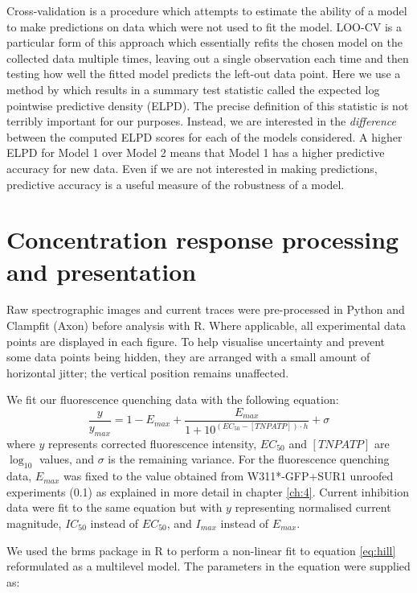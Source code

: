 Cross-validation is a procedure which attempts to estimate the ability of a model to make predictions on data which were not used to fit the model.
LOO-CV is a particular form of this approach which essentially refits the chosen model on the collected data multiple times, leaving out a single observation each time and then testing how well the fitted model predicts the left-out data point.
Here we use a method by \textcite{vehtari_practical_2017} which results in a summary test statistic called the expected log pointwise predictive density (ELPD).
The precise definition of this statistic is not terribly important for our purposes.
Instead, we are interested in the \textit{difference} between the computed ELPD scores for each of the models considered.
A higher ELPD for Model 1 over Model 2 means that Model 1 has a higher predictive accuracy for new data.
Even if we are not interested in making predictions, predictive accuracy is a useful measure of the robustness of a model.

\section{Concentration response processing and presentation}
Raw spectrographic images and current traces were pre-processed in Python and Clampfit (Axon) before analysis with R.
Where applicable, all experimental data points are displayed in each figure.
To help visualise uncertainty and prevent some data points being hidden, they are arranged with a small amount of horizontal jitter; the vertical position remains unaffected.

We fit our fluorescence quenching data with the following equation:
\begin{equation} \label{eq:hill}
    \frac{y}{y_{max}} = 1 - E_{max} + \frac{E_{max}}{1 + 10^{(EC_{50} - [TNPATP]) \cdot h}} + \sigma
\end{equation}
where $y$ represents corrected fluorescence intensity, $EC_{50}$ and $[TNPATP]$ are $\log_{10}$ values, and $\sigma$ is the remaining variance.
For the fluorescence quenching data, $E_{max}$ was fixed to the value obtained from W311*-GFP+SUR1 unroofed experiments (0.1) as explained in more detail in chapter \ref{ch:4}.
Current inhibition data were fit to the same equation but with $y$ representing normalised current magnitude, $IC_{50}$ instead of $EC_{50}$, and $I_{max}$ instead of $E_{max}$.

We used the brms package in R to perform a non-linear fit to equation \ref{eq:hill} reformulated as a multilevel model.
The parameters in the equation were supplied as:

